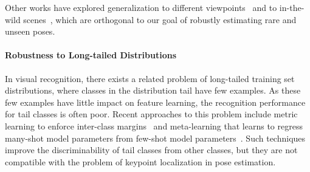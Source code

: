 \documentclass[runningheads]{llncs}
\begin{document}
Other works have explored generalization to different viewpoints~\cite{fang2018learning,veges20193d} and to in-the-wild scenes~\cite{yang20183d,habibie2019wild}, which are orthogonal to our goal of robustly estimating rare and unseen poses.


\paragraph{\textbf{Robustness to Long-tailed Distributions}}

In visual recognition, there exists a related problem of long-tailed training set distributions, where classes in the distribution tail have few examples. As these few examples have little impact on feature learning, the recognition performance for tail classes is often poor. Recent approaches to this problem include metric learning to enforce inter-class margins~\cite{huang2016learning} and meta-learning that learns to regress many-shot model parameters from few-shot model parameters~\cite{wang2017learning}. Such techniques improve the discriminability of tail classes from other classes, but they are not compatible with the problem of keypoint localization in pose estimation. 
\end{document}
